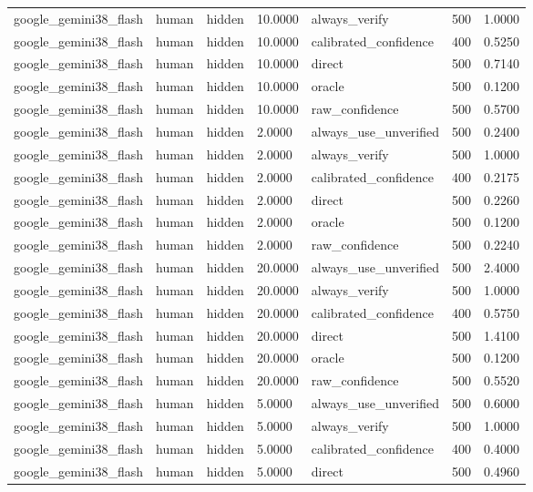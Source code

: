 \begin{tabular}{lllllll}
google\_gemini38\_flash & human & hidden & 10.0000 & always\_verify & 500 & 1.0000 \\
google\_gemini38\_flash & human & hidden & 10.0000 & calibrated\_confidence & 400 & 0.5250 \\
google\_gemini38\_flash & human & hidden & 10.0000 & direct & 500 & 0.7140 \\
google\_gemini38\_flash & human & hidden & 10.0000 & oracle & 500 & 0.1200 \\
google\_gemini38\_flash & human & hidden & 10.0000 & raw\_confidence & 500 & 0.5700 \\
google\_gemini38\_flash & human & hidden & 2.0000 & always\_use\_unverified & 500 & 0.2400 \\
google\_gemini38\_flash & human & hidden & 2.0000 & always\_verify & 500 & 1.0000 \\
google\_gemini38\_flash & human & hidden & 2.0000 & calibrated\_confidence & 400 & 0.2175 \\
google\_gemini38\_flash & human & hidden & 2.0000 & direct & 500 & 0.2260 \\
google\_gemini38\_flash & human & hidden & 2.0000 & oracle & 500 & 0.1200 \\
google\_gemini38\_flash & human & hidden & 2.0000 & raw\_confidence & 500 & 0.2240 \\
google\_gemini38\_flash & human & hidden & 20.0000 & always\_use\_unverified & 500 & 2.4000 \\
google\_gemini38\_flash & human & hidden & 20.0000 & always\_verify & 500 & 1.0000 \\
google\_gemini38\_flash & human & hidden & 20.0000 & calibrated\_confidence & 400 & 0.5750 \\
google\_gemini38\_flash & human & hidden & 20.0000 & direct & 500 & 1.4100 \\
google\_gemini38\_flash & human & hidden & 20.0000 & oracle & 500 & 0.1200 \\
google\_gemini38\_flash & human & hidden & 20.0000 & raw\_confidence & 500 & 0.5520 \\
google\_gemini38\_flash & human & hidden & 5.0000 & always\_use\_unverified & 500 & 0.6000 \\
google\_gemini38\_flash & human & hidden & 5.0000 & always\_verify & 500 & 1.0000 \\
google\_gemini38\_flash & human & hidden & 5.0000 & calibrated\_confidence & 400 & 0.4000 \\
google\_gemini38\_flash & human & hidden & 5.0000 & direct & 500 & 0.4960 \\

\end{tabular}
